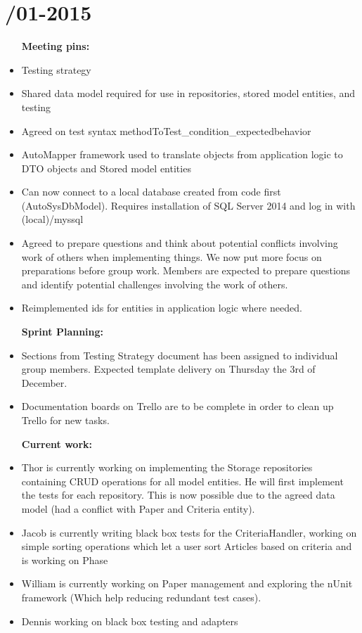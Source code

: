 \section{/01-2015} %
\attend{\at}{\at}{\at}{\at}


\begin{itemize}
	\item [\textbf{Meeting pins:}]
	\item Testing strategy
	\item Shared data model required for use in repositories, stored model entities, and testing 
	\item Agreed on test syntax methodToTest\_condition\_expectedbehavior
	\item AutoMapper framework used to translate objects from application logic to DTO objects and Stored model entities
	\item Can now connect to a local database created from code first (AutoSysDbModel). Requires installation of SQL Server 2014 and log in with (local)/myssql 
	\item Agreed to prepare questions and think about potential conflicts involving work of others when implementing things. We now put more focus on preparations before group work. Members are expected to prepare questions and identify potential challenges involving the work of others. 
	\item Reimplemented ids for entities in application logic where needed. 
\end{itemize}

\begin{itemize}
	\item [\textbf{Sprint Planning:}]
	\item Sections from Testing Strategy document has been assigned to individual group members. Expected template delivery on Thursday the 3rd of December. 
	\item Documentation boards on Trello are to be complete in order to clean up Trello for new tasks. 
\end{itemize}

\begin{itemize}
	\item [\textbf{Current work:}]
	\item Thor is currently working on implementing the Storage repositories containing CRUD operations for all model entities. He will first implement the tests for each repository. This is now possible due to the agreed data model (had a conflict with Paper and Criteria entity). 
	\item Jacob is currently writing black box tests for the CriteriaHandler, working on  simple sorting operations which let a user sort Articles based on criteria and is working on Phase
	\item William is currently working on Paper management and exploring the nUnit framework (Which help reducing redundant test cases).
	\item Dennis working on black box testing and adapters 
\end{itemize}
